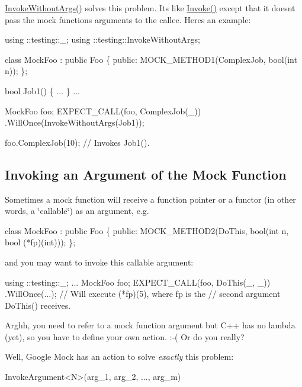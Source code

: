 {\ttfamily \hyperlink{namespacetesting_a88cc1999296bc630f6a49cdf66bb21f9}{Invoke\+Without\+Args()}} solves this problem. It\textquotesingle{}s like {\ttfamily \hyperlink{namespacetesting_a12aebaf8363d49a383047529f798b694}{Invoke()}} except that it doesn\textquotesingle{}t pass the mock function\textquotesingle{}s arguments to the callee. Here\textquotesingle{}s an example\+:


\begin{DoxyCode}
using ::testing::\_;
using ::testing::InvokeWithoutArgs;

class MockFoo : public Foo \{
 public:
  MOCK\_METHOD1(ComplexJob, bool(int n));
\};

bool Job1() \{ ... \}
...

  MockFoo foo;
  EXPECT\_CALL(foo, ComplexJob(\_))
      .WillOnce(InvokeWithoutArgs(Job1));

  foo.ComplexJob(10);  // Invokes Job1().
\end{DoxyCode}


\subsection*{Invoking an Argument of the Mock Function}

Sometimes a mock function will receive a function pointer or a functor (in other words, a \char`\"{}callable\char`\"{}) as an argument, e.\+g.


\begin{DoxyCode}
class MockFoo : public Foo \{
 public:
  MOCK\_METHOD2(DoThis, bool(int n, bool (*fp)(int)));
\};
\end{DoxyCode}


and you may want to invoke this callable argument\+:


\begin{DoxyCode}
using ::testing::\_;
...
  MockFoo foo;
  EXPECT\_CALL(foo, DoThis(\_, \_))
      .WillOnce(...);
  // Will execute (*fp)(5), where fp is the
  // second argument DoThis() receives.
\end{DoxyCode}


Arghh, you need to refer to a mock function argument but C++ has no lambda (yet), so you have to define your own action. \+:-\/( Or do you really?

Well, Google Mock has an action to solve {\itshape exactly} this problem\+:


\begin{DoxyCode}
InvokeArgument<N>(arg\_1, arg\_2, ..., arg\_m)
\end{DoxyCode}


